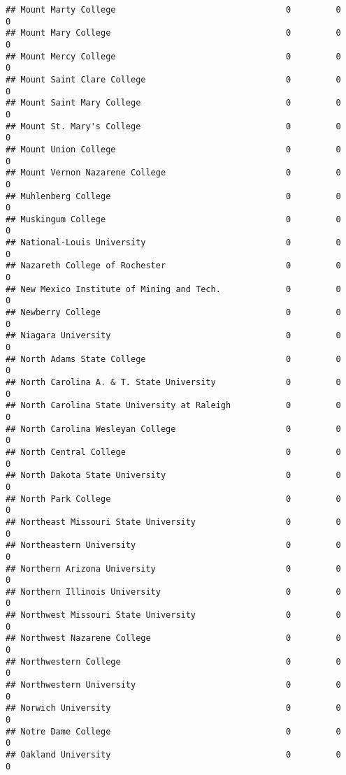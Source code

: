 \documentclass[
]{article}
\begin{document}
\begin{verbatim}
## Mount Marty College                                  0         0           0
## Mount Mary College                                   0         0           0
## Mount Mercy College                                  0         0           0
## Mount Saint Clare College                            0         0           0
## Mount Saint Mary College                             0         0           0
## Mount St. Mary's College                             0         0           0
## Mount Union College                                  0         0           0
## Mount Vernon Nazarene College                        0         0           0
## Muhlenberg College                                   0         0           0
## Muskingum College                                    0         0           0
## National-Louis University                            0         0           0
## Nazareth College of Rochester                        0         0           0
## New Mexico Institute of Mining and Tech.             0         0           0
## Newberry College                                     0         0           0
## Niagara University                                   0         0           0
## North Adams State College                            0         0           0
## North Carolina A. & T. State University              0         0           0
## North Carolina State University at Raleigh           0         0           0
## North Carolina Wesleyan College                      0         0           0
## North Central College                                0         0           0
## North Dakota State University                        0         0           0
## North Park College                                   0         0           0
## Northeast Missouri State University                  0         0           0
## Northeastern University                              0         0           0
## Northern Arizona University                          0         0           0
## Northern Illinois University                         0         0           0
## Northwest Missouri State University                  0         0           0
## Northwest Nazarene College                           0         0           0
## Northwestern College                                 0         0           0
## Northwestern University                              0         0           0
## Norwich University                                   0         0           0
## Notre Dame College                                   0         0           0
## Oakland University                                   0         0           0

\end{verbatim}
\end{document}
